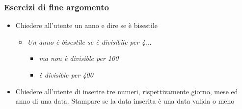 \begin{exerciseframe}
    \frametitle{Esercizi di fine argomento}

    \begin{itemize}
        \item Chiedere all'utente un anno e dire se è bisestile
        \begin{itemize}
            \item \textit{Un anno è bisestile se è divisibile per 4...}
            \begin{itemize}
                \item \textit{ma non è divisible per 100}
                \item \textit{è divisible per 400}
            \end{itemize}
        \end{itemize}

        \bigskip
        \item Chiedere all'utente di inserire tre numeri, rispettivamente giorno, mese ed anno di una data. Stampare se la data inserita è una data valida o meno
    \end{itemize}
\end{exerciseframe}